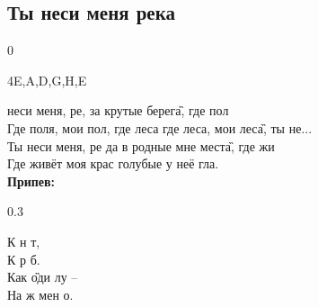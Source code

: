 \documentclass[fleqn,a5paper,12pt,twoside]{guitartabs}
\newcommand{\musVspace}{\vspace{2mm}}
\begin{document}
\subsection*{Ты неси меня река}
\begin{spacing}{0}
\begin{tabline}{4}{}{}{E,A,D,G,H,E}
\nextbar
{}
\nextbar
{}
\nextbar
{}
\end{tabline}
\end{spacing}%
     неси меня, ре, за крутые берег\G{а}, где пол\\
    Где поля, мои пол, где леса где леса, мои лес\G{а}, ты не...\\
    Ты неси меня, ре да в родные мне мест\G{а}, где жи\\
    Где живёт моя крас голубые у неё гла.\musVspace\\
    \musVspace
    \-\hspace{10mm}\textbf{Припев:} \begin{spacing}{0.3} \end{spacing} %
    \-\hspace{10mm}К н т,\\
    \-\hspace{10mm}К р б.\\
    \-\hspace{10mm}Как \G{оди} лу --\\
    \-\hspace{10mm}На  ж мен о.\musVspace\\
\end{document}
